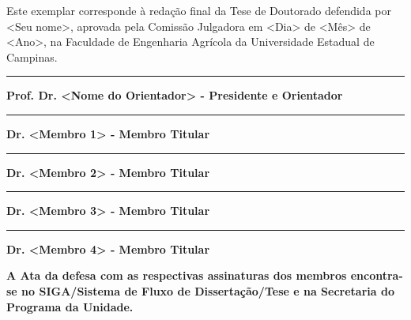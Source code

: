\noindent Este exemplar corresponde à redação final da Tese de Doutorado defendida por <Seu nome>, aprovada pela Comissão Julgadora em <Dia> de <Mês> de <Ano>, na Faculdade de Engenharia Agrícola da Universidade Estadual de Campinas.


\vspace{5.5cm}
\rule{10cm}{1pt}

\textbf{Prof. Dr. <Nome do Orientador> - Presidente e Orientador}

\vspace{1.7cm}
\rule{10cm}{1pt}

\textbf{Dr. <Membro 1> - Membro Titular}

\vspace{1.7cm}
\rule{10cm}{1pt}

\textbf{Dr. <Membro 2> - Membro Titular}

\vspace{1.7cm}
\rule{10cm}{1pt}

\textbf{Dr. <Membro 3> - Membro Titular}

\vspace{1.7cm}
\rule{10cm}{1pt}

\textbf{Dr. <Membro 4> - Membro Titular}

\vspace{1.7cm}

\noindent \textbf{A Ata da defesa com as respectivas assinaturas dos membros encontra-se no SIGA/Sistema de Fluxo de Dissertação/Tese e na Secretaria do Programa da Unidade.}